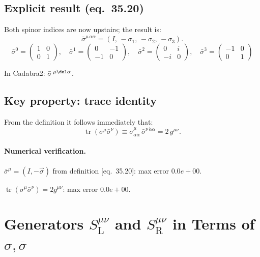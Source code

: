 \documentclass[12pt]{article}
\newcommand{\verified}[1]{\textcolor{verifygreen}{\checkmark\; #1}}
\begin{document}
\subsection{Explicit result (eq.~35.20)}

Both spinor indices are now upstairs; the result is:
\begin{equation}
  \bar\sigma^{\mu\,\dot\alpha\alpha}
  = (I,\,-\sigma_1,\,-\sigma_2,\,-\sigma_3).
  \tag{35.20}
\end{equation}
\[
  \bar\sigma^0 = \begin{pmatrix}1 & 0 \\ 0 & 1\end{pmatrix},\quad
  \bar\sigma^1 = \begin{pmatrix}0 & -1 \\ -1 & 0\end{pmatrix},\quad
  \bar\sigma^2 = \begin{pmatrix}0 & i \\ -i & 0\end{pmatrix},\quad
  \bar\sigma^3 = \begin{pmatrix}-1 & 0 \\ 0 & 1\end{pmatrix}
\]

In Cadabra2: $\bar{\sigma}\,^{\mu \dal \alpha}$.

\subsection{Key property: trace identity}

From the definition it follows immediately that:
\begin{equation}
  \operatorname{tr}(\sigma^\mu\bar\sigma^\nu)
  \equiv \sigma^\mu_{\alpha\dot\alpha}\,\bar\sigma^{\nu\,\dot\alpha\alpha}
  = 2\,g^{\mu\nu}.
\end{equation}

\paragraph{Numerical verification.}
\verified{$\bar\sigma^{\mu} = (I,-\vec\sigma)$ from definition [eq.~35.20]: max error $0.0e+00$.}

\verified{$\operatorname{tr}(\sigma^\mu\bar\sigma^\nu) = 2g^{\mu\nu}$: max error $0.0e+00$.}

\section{Generators \texorpdfstring{$S^{\mu\nu}_{\mathrm{L}}$}{S\_L} and
         \texorpdfstring{$S^{\mu\nu}_{\mathrm{R}}$}{S\_R}
         in Terms of \texorpdfstring{$\sigma,\bar\sigma$}{sigma,sigmabar}
         \quad [eq.~35.21--35.22]}
\end{document}
